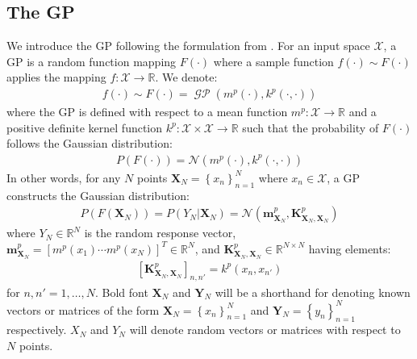 \documentclass{article}
\newcommand{\GP}{\operatorname{\mathcal{GP}}}
\numberwithin{equation}{section}
\begin{document}
\subsection{The GP}\label{section:the-gp}
We introduce the GP following the formulation from \cite{rasmussen2003gaussian}. For an input space $\mathcal{X}$, a GP is a random function mapping $F(\cdot)$ where a sample function $f(\cdot) \sim F(\cdot)$ applies the mapping $f: \mathcal{X} \rightarrow \mathbb{R}$. We denote:
\begin{align}
    f(\cdot) \sim F(\cdot) = \GP\left(m^p(\cdot), k^p(\cdot, \cdot)\right)
    \label{gp}
\end{align}
where the GP is defined with respect to a mean function $m^p: \mathcal{X} \rightarrow \mathbb{R}$ and a positive definite kernel function $k^p: \mathcal{X} \times \mathcal{X} \rightarrow \mathbb{R}$ such that the probability of $F(\cdot)$ follows the Gaussian distribution:
\begin{align}
    P\left(F\left(\cdot \right)\right) =  \mathcal{N}(m^p(\cdot), k^p(\cdot, \cdot))
    \label{gp-normal}
\end{align}
In other words, for any $N$ points $\mathbf{X}_N = \left\{ x_n\right\}_{n=1}^N$ where $x_n \in \mathcal{X}$, a GP constructs the Gaussian distribution:
\begin{align}
    \label{gp-vector}
    P\left(F\left(\mathbf{X}_N\right)\right) = P\left(Y_N \vert \mathbf{X}_N\right) = \mathcal{N}\left(\mathbf{m}^p_{\mathbf{X}_N}, \mathbf{K}^{p}_{\mathbf{X}_N, \mathbf{X}_N}\right)
\end{align}
where $Y_N \in \mathbb{R}^{N}$ is the random response vector, $\mathbf{m}^p_{\mathbf{X}_N} = \left[ m^p(x_1) \cdots m^p(x_N)\right]^T \in \mathbb{R}^N$, and $\mathbf{K}^p_{\mathbf{X}_N, \mathbf{X}_N} \in \mathbb{R}^{N \times N}$ having elements:
\begin{align}
    \left[\mathbf{K}^p_{\mathbf{X}_N, \mathbf{X}_N}\right]_{n, n'} = k^p(x_n, x_{n'})
\end{align}
for $n, n'=1,\dots, N$. Bold font $\mathbf{X}_N$ and $\mathbf{Y}_N$ will be a shorthand for denoting known vectors or matrices of the form $\mathbf{X}_N = \left\{ x_n\right\}_{n=1}^N$ and $\mathbf{Y}_N = \left\{ y_n\right\}_{n=1}^N$ respectively. $X_N$ and $Y_N$ will denote random vectors or matrices with respect to $N$ points.
\end{document}
